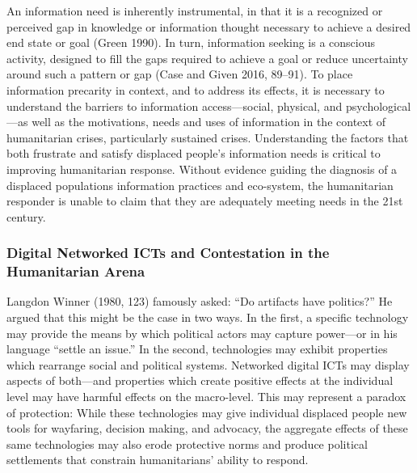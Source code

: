 \documentclass[
]{article}
\begin{document}
An information need is inherently instrumental, in that it is a
recognized or perceived gap in knowledge or information thought
necessary to achieve a desired end state or goal (Green 1990). In turn,
information seeking is a conscious activity, designed to fill the gaps
required to achieve a goal or reduce uncertainty around such a pattern
or gap (Case and Given 2016, 89--91). To place information precarity in
context, and to address its effects, it is necessary to understand the
barriers to information access---social, physical, and
psychological---as well as the motivations, needs and uses of
information in the context of humanitarian crises, particularly
sustained crises. Understanding the factors that both frustrate and
satisfy displaced people's information needs is critical to improving
humanitarian response. Without evidence guiding the diagnosis of a
displaced populations information practices and eco-system, the
humanitarian responder is unable to claim that they are adequately
meeting needs in the 21st century.

\hypertarget{digital-networked-icts-and-contestation-in-the-humanitarian-arena}{%
\subsubsection{Digital Networked ICTs and Contestation in the
Humanitarian
Arena}\label{digital-networked-icts-and-contestation-in-the-humanitarian-arena}}

Langdon Winner (1980, 123) famously asked: ``Do artifacts have
politics?'' He argued that this might be the case in two ways. In the
first, a specific technology may provide the means by which political
actors may capture power---or in his language ``settle an issue.'' In
the second, technologies may exhibit properties which rearrange social
and political systems. Networked digital ICTs may display aspects of
both---and properties which create positive effects at the individual
level may have harmful effects on the macro-level. This may represent a
paradox of protection: While these technologies may give individual
displaced people new tools for wayfaring, decision making, and advocacy,
the aggregate effects of these same technologies may also erode
protective norms and produce political settlements that constrain
humanitarians' ability to respond.
\end{document}
